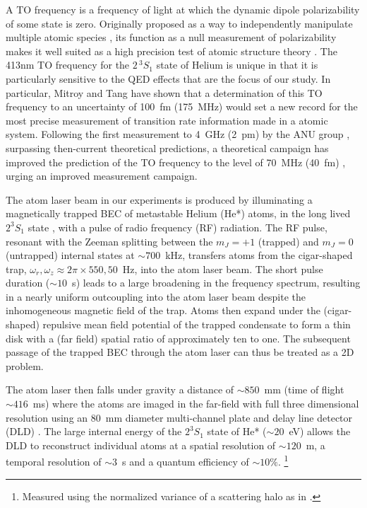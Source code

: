 \documentclass[aps,prl,
,reprint,
superscriptaddress,
onecolumn,
showpacs,preprintnumbers,
 amsmath,amssymb,
]{revtex4-1}
\begin{document}
A TO frequency is a frequency of light at which the dynamic dipole polarizability of some state is zero.
Originally proposed as a way to independently manipulate multiple atomic species \cite{PhysRevA.75.053612}, its function as a null measurement of polarizability makes it well suited as a high precision test of atomic structure theory  \cite{PhysRevA.88.052515}.
The 413nm TO frequency for the $2\,^{3}S_{1}$ state of Helium is unique in that it is particularly sensitive to the QED effects that are the focus of our study. In particular, Mitroy and Tang have shown \cite{PhysRevA.88.052515} that a determination of this TO frequency to an uncertainty of 100~fm (175~MHz) would set a new record for the most precise measurement of transition rate information made in a atomic system. 
Following the first measurement to 4~GHz (2~pm) by the ANU group \cite{2017arXiv170808200H,PhysRevLett.115.043004}, surpassing then-current theoretical predictions, a theoretical campaign has improved the prediction of the TO frequency to the level of 70~MHz (40~fm) \cite{PhysRevA.93.052516,manalothesis,Drake2019,PhysRevA.99.040502}, urging an improved measurement campaign.


 The atom laser beam in our experiments is produced by illuminating a magnetically trapped BEC of metastable Helium (He*) atoms, in the long lived $2^3S_1$ state \cite{Hodgman2009a}, with a  pulse  of radio frequency (RF) radiation.
 The RF pulse, resonant with the Zeeman splitting between the $m_J{=}+1$ (trapped) and $m_J{=}0$ (untrapped) internal states at ${\sim} 700$~kHz, transfers atoms from the cigar-shaped trap, ${\omega_r,\omega_z}\approx2\pi\times{550, 50}$~Hz, into the atom laser beam. 
 The short pulse duration (${\sim}10$~\textmu{}s) leads to a large broadening in the frequency spectrum, resulting in a nearly uniform outcoupling into the atom laser beam despite the inhomogeneous magnetic field of the trap.
 Atoms then expand under the (cigar-shaped) repulsive mean field potential of the trapped condensate to form a thin disk with a (far field) spatial ratio of approximately ten to one. The subsequent passage of the trapped BEC through the atom laser can thus be treated as a 2D problem.

 The atom laser then falls under gravity a distance of ${\sim} 850$~mm (time of flight ${\sim} 416$~ms) where the atoms are imaged in the far-field with full three dimensional resolution using an $80$~mm diameter multi-channel plate and delay line detector (DLD) \cite{Manning:10}. 
 The large internal energy of the $2^3S_1$ state of He* (${\sim} 20$~eV) allows the DLD to reconstruct individual atoms at a spatial resolution of ${\sim} 120$~\textmu{}m, a temporal resolution of ${\sim} 3$~\textmu{}s \citep{SOMs} and a quantum efficiency of ${\sim} 10\%$.
 \footnote{Measured using the normalized variance of a scattering halo as in \cite{PhysRevLett.108.260401}.}
\end{document}
